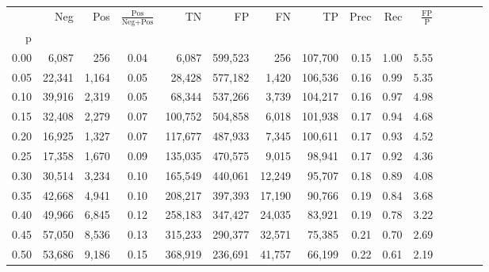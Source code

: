 \begin{tabular}{rrrcrrrrrrrrrrr}
\toprule
{} &     Neg &     Pos & $\frac{\text{Pos}}{\text{Neg}+\text{Pos}}$ &       TN &       FP &       FN &       TP &  Prec &   Rec & $\frac{\text{FP}}{\text{P}}$ \\
p    &         &         &                                            &          &          &          &          &       &       &                              \\
\midrule
0.00 &   6,087 &     256 &                                       0.04 &    6,087 &  599,523 &      256 &  107,700 &  0.15 &  1.00 &                         5.55 \\
0.05 &  22,341 &   1,164 &                                       0.05 &   28,428 &  577,182 &    1,420 &  106,536 &  0.16 &  0.99 &                         5.35 \\
0.10 &  39,916 &   2,319 &                                       0.05 &   68,344 &  537,266 &    3,739 &  104,217 &  0.16 &  0.97 &                         4.98 \\
0.15 &  32,408 &   2,279 &                                       0.07 &  100,752 &  504,858 &    6,018 &  101,938 &  0.17 &  0.94 &                         4.68 \\
0.20 &  16,925 &   1,327 &                                       0.07 &  117,677 &  487,933 &    7,345 &  100,611 &  0.17 &  0.93 &                         4.52 \\
0.25 &  17,358 &   1,670 &                                       0.09 &  135,035 &  470,575 &    9,015 &   98,941 &  0.17 &  0.92 &                         4.36 \\
0.30 &  30,514 &   3,234 &                                       0.10 &  165,549 &  440,061 &   12,249 &   95,707 &  0.18 &  0.89 &                         4.08 \\
0.35 &  42,668 &   4,941 &                                       0.10 &  208,217 &  397,393 &   17,190 &   90,766 &  0.19 &  0.84 &                         3.68 \\
0.40 &  49,966 &   6,845 &                                       0.12 &  258,183 &  347,427 &   24,035 &   83,921 &  0.19 &  0.78 &                         3.22 \\
0.45 &  57,050 &   8,536 &                                       0.13 &  315,233 &  290,377 &   32,571 &   75,385 &  0.21 &  0.70 &                         2.69 \\
0.50 &  53,686 &   9,186 &                                       0.15 &  368,919 &  236,691 &   41,757 &   66,199 &  0.22 &  0.61 &                         2.19 \\

\end{tabular}
